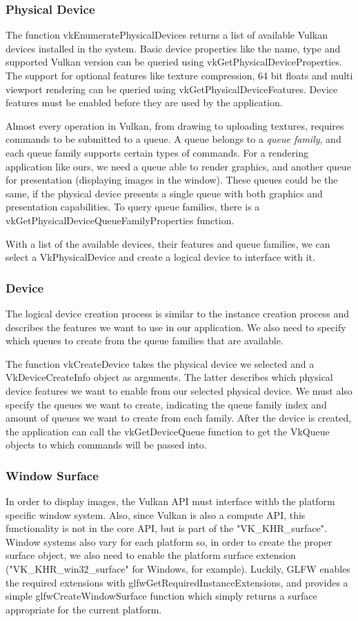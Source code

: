 \subsubsection{Physical Device}
The function vkEnumeratePhysicalDevices returns a list of available Vulkan devices installed in the system. Basic device properties like the name, type and supported Vulkan version can be queried using vkGetPhysicalDeviceProperties. The support for optional features like texture compression, 64 bit floats and multi viewport rendering can be queried using vkGetPhysicalDeviceFeatures. Device features must be enabled before they are used by the application.

Almost every operation in Vulkan, from drawing to uploading textures, requires commands to be submitted to a queue. A queue belongs to a \emph{queue family}, and each queue family supports certain types of commands. For a rendering application like ours, we need a queue able to render graphics, and another queue for presentation (displaying images in the window). These queues could be the same, if the physical device presents a single queue with both graphics and presentation capabilities. To query queue families, there is a vkGetPhysicalDeviceQueueFamilyProperties function.

With a list of the available devices, their features and queue families, we can select a VkPhysicalDevice and create a logical device to interface with it.

\subsubsection{Device}
The logical device creation process is similar to the instance creation process and describes the features we want to use in our application. We also need to specify which queues to create from the queue families that are available. 

The function vkCreateDevice takes the physical device we selected and a VkDeviceCreateInfo object as arguments. The latter describes which physical device features we want to enable from our selected physical device. We must also specify the queues we want to create, indicating the queue family index and amount of queues we want to create from each family. After the device is created, the application can call the vkGetDeviceQueue function to get the VkQueue objects to which commands will be passed into.

\subsubsection{Window Surface}
In order to display images, the Vulkan API must interface withb the platform specific window system. Also, since Vulkan is also a compute API, this functionality is not in the core API, but is part of the "VK\_KHR\_surface". Window systems also vary for each platform so, in order to create the proper surface object, we also need to enable the platform surface extension ("VK\_KHR\_win32\_surface" for Windows, for example). Luckily, GLFW enables the required extensions with glfwGetRequiredInstanceExtensions, and provides a simple glfwCreateWindowSurface function which simply returns a surface appropriate for the current platform.

